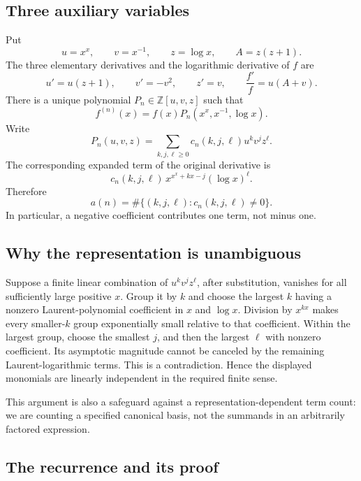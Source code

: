 \documentclass[11pt]{article}
\numberwithin{equation}{section}
\theoremstyle{definition}
\theoremstyle{remark}
\newcommand{\Z}{\mathbb Z}
\begin{document}
\subsection{Three auxiliary variables}
Put
\[
 u=x^x,\qquad v=x^{-1},\qquad z=\log x,\qquad A=z(z+1).
\]
The three elementary derivatives and the logarithmic derivative of $f$ are
\begin{equation}\label{eq:basicderivatives}
 u'=u(z+1),\qquad v'=-v^2,\qquad z'=v,
 \qquad \frac{f'}{f}=u(A+v).
\end{equation}
There is a unique polynomial $P_n\in\Z[u,v,z]$ such that
\begin{equation}\label{eq:Pdefinition}
 f^{(n)}(x)=f(x)P_n(x^x,x^{-1},\log x).
\end{equation}
Write
\begin{equation}\label{eq:coeffdefinition}
 P_n(u,v,z)=\sum_{k,j,\ell\ge0}c_n(k,j,\ell)u^kv^jz^\ell.
\end{equation}
The corresponding expanded term of the original derivative is
\[
 c_n(k,j,\ell)\,x^{x^x+kx-j}(\log x)^\ell.
\]
Therefore
\begin{equation}\label{eq:count}
 a(n)=\#\{(k,j,\ell):c_n(k,j,\ell)\ne0\}.
\end{equation}
In particular, a negative coefficient contributes one term, not minus one.

\subsection{Why the representation is unambiguous}

Suppose a finite linear combination of $u^kv^jz^\ell$, after substitution,
vanishes for all sufficiently large positive $x$. Group it by $k$ and choose
the largest $k$ having a nonzero Laurent-polynomial coefficient in $x$ and
$\log x$. Division by $x^{kx}$ makes every smaller-$k$ group exponentially
small relative to that coefficient. Within the largest group, choose the
smallest $j$, and then the largest $\ell$ with nonzero coefficient. Its
asymptotic magnitude cannot be canceled by the remaining Laurent-logarithmic
terms. This is a contradiction. Hence the displayed monomials are linearly
independent in the required finite sense.

This argument is also a safeguard against a representation-dependent term
count: we are counting a specified canonical basis, not the summands in an
arbitrarily factored expression.

\subsection{The recurrence and its proof}
\end{document}
